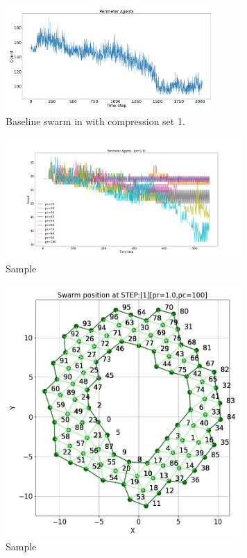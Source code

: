 \documentclass[12pt,a4paper]{IEEEtran}
\begin{document}
\begin{figure}[H]
	\begin{center}
		\includegraphics[width=8cm]{figures/baselineSwarmPerimeter1}
	\end{center}
	\caption{Baseline swarm in with compression set 1. \label{fig:baselineSwarmPerimeter1}}
\end{figure}

\begin{figure}[H]
	\begin{center}
		\includegraphics[width=9cm]{figures/Figure_1}
	\end{center}
	\caption{Sample}
\end{figure}
\begin{figure}[H]
	\begin{center}
		\includegraphics[width=9cm]{figures/Figure_2}
	\end{center}
	\caption{Sample}
\end{figure}
\end{document}
